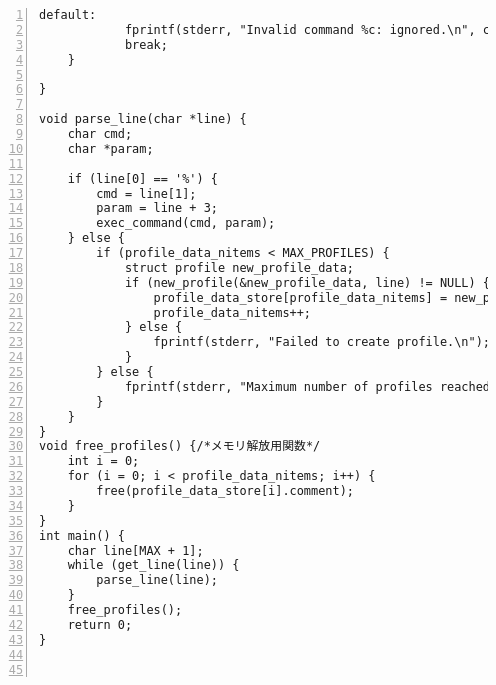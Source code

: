 \begin{Verbatim}[numbers=left, xleftmargin=10mm, numbersep=6pt,
                    fontsize=\small, baselinestretch=0.8]
        default:
            fprintf(stderr, "Invalid command %c: ignored.\n", cmd);
            break;
    }

}

void parse_line(char *line) {
    char cmd;
    char *param;

    if (line[0] == '%') {
        cmd = line[1];
        param = line + 3;
        exec_command(cmd, param);
    } else {
        if (profile_data_nitems < MAX_PROFILES) {
            struct profile new_profile_data;
            if (new_profile(&new_profile_data, line) != NULL) {
                profile_data_store[profile_data_nitems] = new_profile_data;
                profile_data_nitems++;
            } else {
                fprintf(stderr, "Failed to create profile.\n");
            }
        } else {
            fprintf(stderr, "Maximum number of profiles reached.\n");
        }
    }
}
void free_profiles() {/*メモリ解放用関数*/
    int i = 0;
    for (i = 0; i < profile_data_nitems; i++) {
        free(profile_data_store[i].comment);
    }
}
int main() {
    char line[MAX + 1];
    while (get_line(line)) {
        parse_line(line);
    }
    free_profiles();
    return 0;
}
                   
                    
\end{Verbatim}



